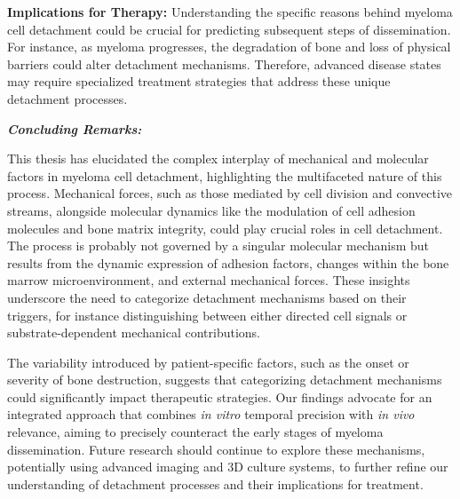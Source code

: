 \textbf{Implications for Therapy:}%
Understanding the specific reasons behind myeloma cell detachment could be
crucial for predicting subsequent steps of dissemination. For instance, as
myeloma progresses, the degradation of bone and loss of physical barriers could
alter detachment mechanisms. Therefore, advanced disease states may require
specialized treatment strategies that address these unique detachment processes.


\textbf{\textit{Concluding Remarks:}}%

This thesis has elucidated the complex interplay of mechanical and molecular
factors in myeloma cell detachment, highlighting the multifaceted nature of this
process. Mechanical forces, such as those mediated by cell division and
convective streams, alongside molecular dynamics like the modulation of cell
adhesion molecules and bone matrix integrity, could play crucial roles in cell
detachment. The process is probably not governed by a singular molecular
mechanism but results from the dynamic expression of adhesion factors, changes
within the bone marrow microenvironment, and external mechanical forces. These
insights underscore the need to categorize detachment mechanisms based on their
triggers, for instance distinguishing between either directed cell signals or
substrate-dependent mechanical contributions. 

The variability introduced by patient-specific factors, such as the onset or
severity of bone destruction, suggests that categorizing detachment mechanisms
could significantly impact therapeutic strategies. Our findings advocate for an
integrated approach that combines \textit{in vitro} temporal precision with
\textit{in vivo} relevance, aiming to precisely counteract the early stages of
myeloma dissemination. Future research should continue to explore these
mechanisms, potentially using advanced imaging and 3D culture systems, to
further refine our understanding of detachment processes and their implications
for treatment. 


%
\label{sec:discussion:conclusioncancer}%















